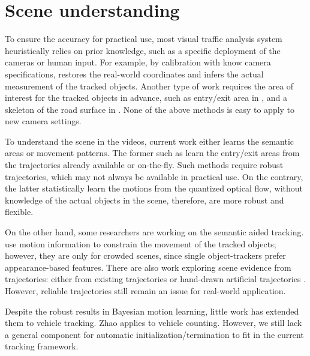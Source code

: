 \section{Scene understanding}

\label{sec:semantic-related}
To ensure the accuracy for practical use, most visual traffic analysis system heuristically relies on prior knowledge, such as a specific deployment of the cameras or human input. For example, by calibration with know camera specifications, \cite{cheng2011intelligent,corral2017slot} restores the real-world coordinates and infers the actual measurement of the tracked objects. Another type of work requires the area of interest for the tracked objects in advance, such as entry/exit area in \cite{tamersoy2009robust,rodriguez2010adaptive,mishra2013video}, and a skeleton of the road surface in \cite{bas2007automatic}. None of the above methods is easy to apply to new camera settings.

To understand the scene in the videos, current work either learns the semantic areas or movement patterns. The former such as \cite{tung2011goal,nedrich2013detecting,yang2012multi} learn the entry/exit areas from the trajectories already available or on-the-fly. Such methods require robust trajectories, which may not always be available in practical use.
On the contrary, the latter \cite{wang2009unsupervised,kuettel2010s,hospedales2009markov,liao2015video} statistically learn the motions from the quantized optical flow, without knowledge of the actual objects in the scene, therefore, are more robust and flexible. 

On the other hand, some researchers are working on the semantic aided tracking. \cite{zhao2012tracking,kratz2010tracking} use motion information to constrain the movement of the tracked objects; however, they are only for crowded scenes, since single object-trackers prefer appearance-based features.
There are also work exploring scene evidence from trajectories: either from existing trajectories \cite{song2010online} or hand-drawn artificial trajectories \cite{manen2014appearances}. However, reliable trajectories still remain an issue for real-world application.

Despite the robust results in Bayesian motion learning, little work has extended them to vehicle tracking.
Zhao \etc \cite{zhao2013counting} applies \cite{wang2009unsupervised} to vehicle counting. However, we still lack a general component for automatic initialization/termination to fit in the current tracking framework.
